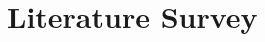 \documentclass[12pt]{article}			%
\begin{document}

\newpage

\section{Literature Survey }
\end{document}
